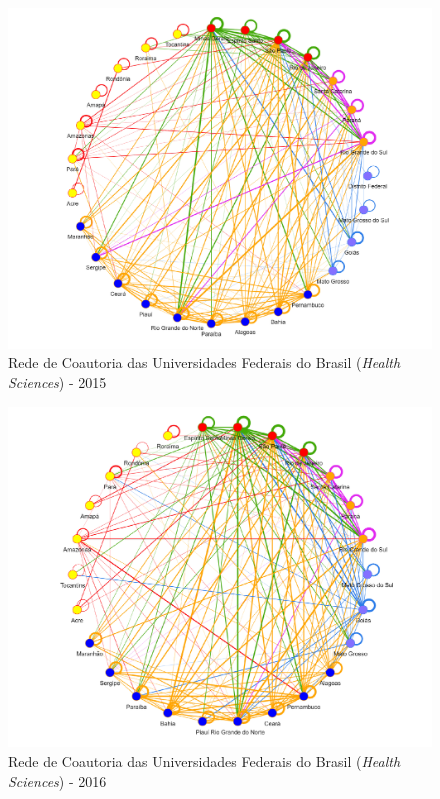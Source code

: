 \begin{figure}[H]
	\centering
	\includegraphics[width=\linewidth]{Imagens/rede-2015.pdf}
	\caption{Rede de Coautoria das Universidades Federais do Brasil (\textit{Health Sciences}) - 2015}
	\label{Rede de Coautoria - UF BR 2015}
\end{figure}

\begin{figure}[H]
	\centering
	\includegraphics[width=\linewidth]{Imagens/rede-2016.pdf}
	\caption{Rede de Coautoria das Universidades Federais do Brasil (\textit{Health Sciences}) - 2016}
	\label{Rede de Coautoria - UF BR 2016}
\end{figure}

